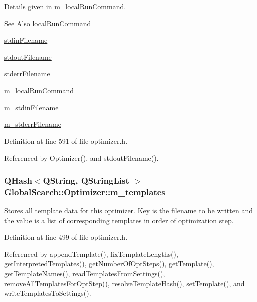 Details given in m\-\_\-local\-Run\-Command.

\begin{DoxySeeAlso}{See Also}
\hyperlink{classGlobalSearch_1_1Optimizer_aed5eb285d45a001c9520c2ed3a5b57a1}{local\-Run\-Command} 

\hyperlink{classGlobalSearch_1_1Optimizer_a5964a9b38d3ae90c8ac36a75d3a35832}{stdin\-Filename} 

\hyperlink{classGlobalSearch_1_1Optimizer_a217750aa50431f9948aa8164fb99de0c}{stdout\-Filename} 

\hyperlink{classGlobalSearch_1_1Optimizer_acaa83cc6bf1dcc263b92450b4f8cb652}{stderr\-Filename} 

\hyperlink{classGlobalSearch_1_1Optimizer_a1cdb6b6c5e929e84c834ba93148fb31e}{m\-\_\-local\-Run\-Command} 

\hyperlink{classGlobalSearch_1_1Optimizer_aca91d12d7aecae052d6ab5ae158acec6}{m\-\_\-stdin\-Filename} 

\hyperlink{classGlobalSearch_1_1Optimizer_a75b800a7f90a03d551f6795404d0c8f1}{m\-\_\-stderr\-Filename} 
\end{DoxySeeAlso}


Definition at line 591 of file optimizer.\-h.



Referenced by Optimizer(), and stdout\-Filename().

\hypertarget{classGlobalSearch_1_1Optimizer_aa5892c64826b7cc7a2baa092efc8c66d}{
\subsubsection[{m\-\_\-templates}]{\setlength{\rightskip}{0pt plus 5cm}Q\-Hash$<$Q\-String, Q\-String\-List $>$ Global\-Search\-::\-Optimizer\-::m\-\_\-templates\hspace{0.3cm}{\ttfamily [protected]}}}\label{classGlobalSearch_1_1Optimizer_aa5892c64826b7cc7a2baa092efc8c66d}
Stores all template data for this optimizer. Key is the filename to be written and the value is a list of corresponding templates in order of optimization step. 

Definition at line 499 of file optimizer.\-h.



Referenced by append\-Template(), fix\-Template\-Lengths(), get\-Interpreted\-Templates(), get\-Number\-Of\-Opt\-Steps(), get\-Template(), get\-Template\-Names(), read\-Templates\-From\-Settings(), remove\-All\-Templates\-For\-Opt\-Step(), resolve\-Template\-Hash(), set\-Template(), and write\-Templates\-To\-Settings().

